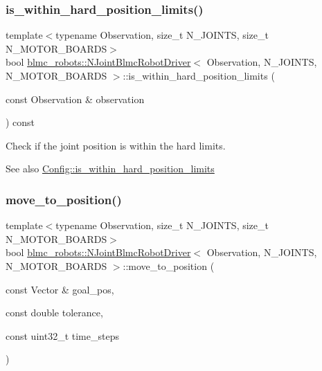\subsubsection{\texorpdfstring{is\+\_\+within\+\_\+hard\+\_\+position\+\_\+limits()}{is\_within\_hard\_position\_limits()}}
{\footnotesize\ttfamily template$<$typename Observation, size\+\_\+t N\+\_\+\+J\+O\+I\+N\+TS, size\+\_\+t N\+\_\+\+M\+O\+T\+O\+R\+\_\+\+B\+O\+A\+R\+DS$>$ \\
bool \hyperlink{classblmc__robots_1_1NJointBlmcRobotDriver}{blmc\+\_\+robots\+::\+N\+Joint\+Blmc\+Robot\+Driver}$<$ Observation, N\+\_\+\+J\+O\+I\+N\+TS, N\+\_\+\+M\+O\+T\+O\+R\+\_\+\+B\+O\+A\+R\+DS $>$\+::is\+\_\+within\+\_\+hard\+\_\+position\+\_\+limits (\begin{DoxyParamCaption}\item[{const Observation \&}]{observation }\end{DoxyParamCaption}) const}



Check if the joint position is within the hard limits. 

\begin{DoxySeeAlso}{See also}
\hyperlink{structblmc__robots_1_1NJointBlmcRobotDriver_1_1Config_ae34fb8f28bdec0401b72b09bc8d48b65}{Config\+::is\+\_\+within\+\_\+hard\+\_\+position\+\_\+limits} 
\end{DoxySeeAlso}
\mbox{\label{classblmc__robots_1_1NJointBlmcRobotDriver_ab29cab22a765bce463f367b6e6dc82ff}} 
\subsubsection{\texorpdfstring{move\+\_\+to\+\_\+position()}{move\_to\_position()}}
{\footnotesize\ttfamily template$<$typename Observation, size\+\_\+t N\+\_\+\+J\+O\+I\+N\+TS, size\+\_\+t N\+\_\+\+M\+O\+T\+O\+R\+\_\+\+B\+O\+A\+R\+DS$>$ \\
bool \hyperlink{classblmc__robots_1_1NJointBlmcRobotDriver}{blmc\+\_\+robots\+::\+N\+Joint\+Blmc\+Robot\+Driver}$<$ Observation, N\+\_\+\+J\+O\+I\+N\+TS, N\+\_\+\+M\+O\+T\+O\+R\+\_\+\+B\+O\+A\+R\+DS $>$\+::move\+\_\+to\+\_\+position (\begin{DoxyParamCaption}\item[{const Vector \&}]{goal\+\_\+pos,  }\item[{const double}]{tolerance,  }\item[{const uint32\+\_\+t}]{time\+\_\+steps }\end{DoxyParamCaption})\hspace{0.3cm}{\ttfamily [protected]}}



